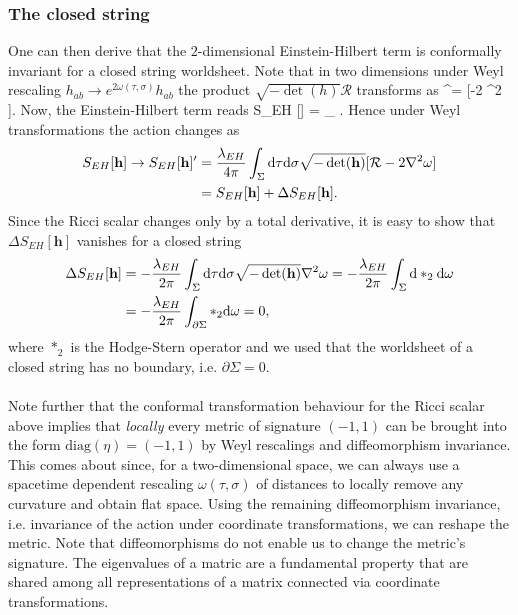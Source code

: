 \subsubsection{The closed string}
One can then derive that the $2$-dimensional Einstein-Hilbert term is conformally invariant for a closed string worldsheet. Note that in two dimensions under Weyl rescaling $h_{ab} \rightarrow e^{2 \omega (\tau,\sigma)} h_{ab}$ the product $\sqrt{-\det(h)} \mathcal{R}$ transforms as
\bse 
{}  \rightarrow {} ^\prime =  [-2 \nabla^2 \omega].
\ese 
Now, the Einstein-Hilbert term reads
\be 
S_{EH} [] =  \int_\Sigma \md \tau \md \sigma {} .
\ee 
Hence under Weyl transformations the action changes as
\begin{align*}
S_{EH}[\mathbf{h}] \rightarrow S_{EH} [\mathbf{h}]^\prime &= \frac{\lambda_{EH}}{4 \pi} \int_\Sigma \mathrm{d} \tau \mathrm{d} \sigma \sqrt{-\det(\mathbf{h})} [\mathcal{R}-2\nabla^2\omega ]\\
&= S_{EH}[\mathbf{h}] + \Delta S_{EH} [\mathbf{h}].
\end{align*}
Since the Ricci scalar changes only by a total derivative, it is easy to show that $\Delta S_{EH}[\mathbf{h}]$ vanishes for a closed string
\begin{align*}
	\Delta S_{EH}[\mathbf{h}] &= -\frac{\lambda_{EH}}{2 \pi} \int_\Sigma \mathrm{d} \tau \mathrm{d} \sigma \sqrt{-\det(\mathbf{h})} \nabla^2 \omega = -\frac{\lambda_{EH}}{2 \pi} \int_\Sigma \mathrm{d} *_2 \mathrm{d} \omega \\
	&= -\frac{\lambda_{EH}}{2 \pi} \int_{\partial \Sigma} *_2 \mathrm{d} \omega = 0,
\end{align*}
where $*_2$ is the Hodge-Stern operator and we used that the worldsheet of a closed string has no boundary, i.e. $\partial \Sigma=0$.\\
\\
Note further that the conformal transformation behaviour for the Ricci scalar above implies that \emph{locally} every metric of signature $(-1,1)$ can be brought into the form $\text{diag}(\eta)=(-1,1)$ by Weyl rescalings and diffeomorphism invariance.\\
This comes about since, for a two-dimensional space, we can always use a spacetime dependent rescaling $\omega(\tau,\sigma)$ of distances to locally remove any curvature and obtain flat space. Using the remaining diffeomorphism invariance, i.e. invariance of the action under coordinate transformations, we can reshape the metric. Note that diffeomorphisms do not enable us to change the metric's signature. The eigenvalues of a matric are a fundamental property that are shared among all representations of a matrix connected via coordinate transformations.

